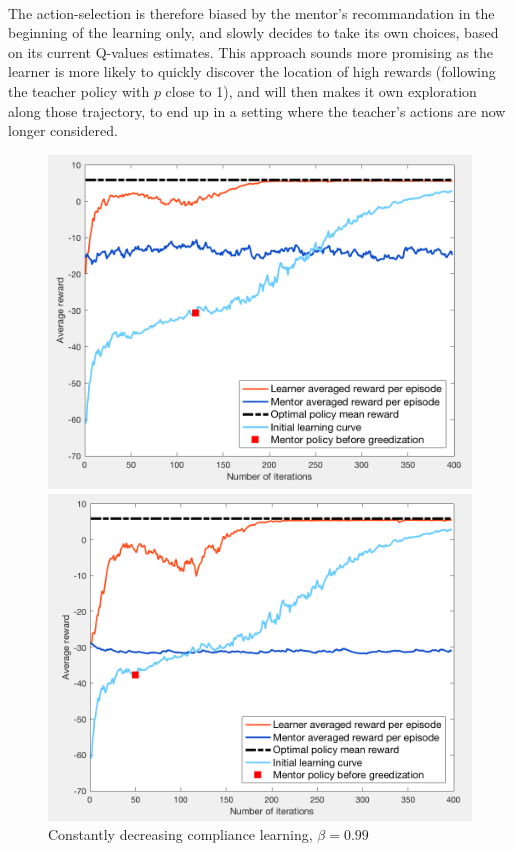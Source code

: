 \documentclass[a4paper]{report}
\begin{document}
{{{{			\paragraph{} The action-selection is therefore biased by the mentor's recommandation in the beginning of the learning only, and slowly decides to take its own choices, based on its current Q-values estimates. This approach sounds more promising as the learner is more likely to quickly discover the location of high rewards (following the teacher policy with $p$ close to 1), and will then makes it own exploration along those trajectory, to end up in a setting where the teacher's actions are now longer considered. 
		
			\begin{figure}[h!]
				\begin{minipage}{0.5\linewidth}
					\begin{center}
						\includegraphics[width=0.95\linewidth]{comp_naive_compliance_120}
						\caption{Constantly decreasing compliance learning, $\beta = 0.99$}
						\label{fig::comp_naive_compliance_120}
					\end{center}
				\end{minipage}
				\begin{minipage}{0.5\linewidth}
					\begin{center}
						\includegraphics[width=0.95\linewidth]{comp_naive_compliance_50}

\end{center}
\end{minipage}
\end{figure}}}}}
\end{document}
